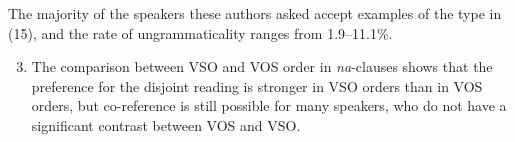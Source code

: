 \documentclass[output=paper]{langsci/langscibook}
\begin{document}
The majority of the speakers these authors asked accept examples of the type in (15), and the rate of ungrammaticality ranges from 1.9--11.1\%.  

\begin{enumerate}\setcounter{enumi}{2}
\item The comparison between VSO and VOS order in \textit{na}{}-clauses shows that the preference for the disjoint reading is stronger in VSO orders than in VOS orders, but co-reference is still possible for many speakers, who do not have a significant contrast between VOS and VSO. 
\end{enumerate}

% 
% 
% 
% 
% 
% 
% 
% 
% 
% 
% 
\end{document}

